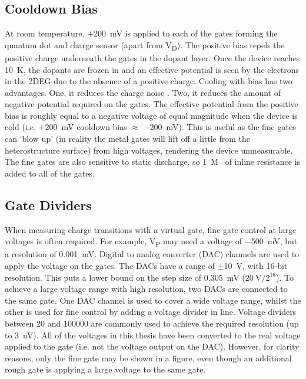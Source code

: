 \subsection{Cooldown Bias}
At room temperature, $+$\qty{200}{mV} is applied to each of the gates forming the quantum dot and charge sensor (apart from V\textsubscript{D}). The positive bias repels the positive charge underneath the gates in the dopant layer. Once the device reaches \qty{10}{K}, the dopants are frozen in and an effective potential is seen by the electrons in the 2DEG due to the absence of a positive charge. Cooling with bias has two advantages. One, it reduces the charge noise \cite{bias_cooling}. Two, it reduces the amount of negative potential required on the gates. The effective potential from the positive bias is roughly equal to a negative voltage of equal magnitude when the device is cold (i.e. $+$\qty{200}{mV} cooldown bias $\approx$ $-$\qty{200}{mV}). This is useful as the fine gates can `blow up' (in reality the metal gates will lift off a little from the heterostructure surface) from high voltages, rendering the device unmeasurable. The fine gates are also sensitive to static discharge, so \qty{1}{M\Omega} of inline resistance is added to all of the gates.  

\subsection{Gate Dividers}
When measuring charge transitions with a virtual gate, fine gate control at large voltages is often required. For example, V\textsubscript{P} may need a voltage of $-$\qty{500}{mV}, but a resolution of \qty{0.001}{mV}. Digital to analog converter (DAC) channels are used to apply the voltage on the gates. The DACs have a range of $\pm$\qty{10}{V}, with 16-bit resolution. This puts a lower bound on the step size of \qty{0.305}{mV} ($\mathrm{\qty{20}{V}/2^{16}}$). To achieve a large voltage range with high resolution, two DACs are connected to the same gate. One DAC channel is used to cover a wide voltage range, whilst the other is used for fine control by adding a voltage divider in line. Voltage dividers between $20$ and $100000$ are commonly used to achieve the required resolution (up to \qty{3}{nV}). All of the voltages in this thesis have been converted to the real voltage applied to the gate (i.e. not the voltage output on the DAC). However, for clarity reasons, only the fine gate may be shown in a figure, even though an additional rough gate is applying a large voltage to the same gate. 













